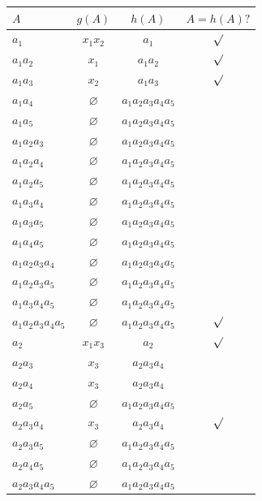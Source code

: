\documentclass[a4paper]{report}
\renewcommand{\textbf}[1]{\begingroup\bfseries\mathversion{bold}#1\endgroup}
\begin{document}
\begin{table}[htb]

\centering

\begin{tabular}{l|c|c|c}

$A$ & $g(A)$ & $h(A)$ & $A = h(A) ?$\\
\hline
\textbf{$a_1$} & \textbf{$x_1x_2$} & $a_1$ & $\surd$\\
\hline
\textbf{$a_1a_2$} & \textbf{$x_1$} & $a_1a_2$ & $\surd$\\
\hline
\textbf{$a_1a_3$} & \textbf{$x_2$} & $a_1a_3$ & $\surd$\\
\hline
$a_1a_4$ & $\varnothing$ & $a_1a_2a_3a_4a_5$ & \\
\hline
$a_1a_5$ & $\varnothing$ & $a_1a_2a_3a_4a_5$ & \\
\hline
$a_1a_2a_3$ & $\varnothing$ & $a_1a_2a_3a_4a_5$ & \\
\hline
$a_1a_2a_4$ & $\varnothing$ & $a_1a_2a_3a_4a_5$ & \\
\hline
$a_1a_2a_5$ & $\varnothing$ & $a_1a_2a_3a_4a_5$ & \\
\hline
$a_1a_3a_4$ & $\varnothing$ & $a_1a_2a_3a_4a_5$ & \\
\hline
$a_1a_3a_5$ & $\varnothing$ & $a_1a_2a_3a_4a_5$ & \\
\hline
$a_1a_4a_5$ & $\varnothing$ & $a_1a_2a_3a_4a_5$ & \\
\hline
$a_1a_2a_3a_4$ & $\varnothing$ & $a_1a_2a_3a_4a_5$ & \\
\hline
$a_1a_2a_3a_5$ & $\varnothing$ & $a_1a_2a_3a_4a_5$ & \\
\hline
$a_1a_3a_4a_5$ & $\varnothing$ & $a_1a_2a_3a_4a_5$ & \\
\hline
\textbf{$a_1a_2a_3a_4a_5$} & \textbf{$\varnothing$} & $a_1a_2a_3a_4a_5$ & $\surd$\\
\hline
\textbf{$a_2$} & \textbf{$x_1x_3$} & $a_2$ & $\surd$\\
\hline
$a_2a_3$ & $x_3$ & $a_2a_3a_4$ & \\
\hline
$a_2a_4$ & $x_3$ & $a_2a_3a_4$ & \\
\hline
$a_2a_5$ & $\varnothing$ & $a_1a_2a_3a_4a_5$ & \\
\hline
\textbf{$a_2a_3a_4$} & \textbf{$x_3$} & $a_2a_3a_4$ & $\surd$\\
\hline
$a_2a_3a_5$ & $\varnothing$ & $a_1a_2a_3a_4a_5$ & \\
\hline
$a_2a_4a_5$ & $\varnothing$ & $a_1a_2a_3a_4a_5$ & \\
\hline
$a_2a_3a_4a_5$ & $\varnothing$ & $a_1a_2a_3a_4a_5$ & \\

\end{tabular}
\end{table}
\end{document}
